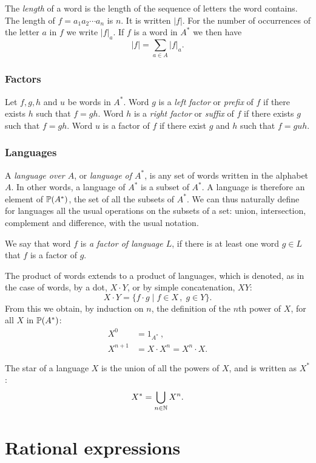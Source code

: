 The \emph{length} of a word is the length of the sequence of letters the word contains. The length of $f = a_1 a_2 \dotsm a_n$ is $n$. It is written $|f|$. For the number of occurrences of the letter $a$ in $f$ we write $|f|_a$. If $f$ is a word in $A^*$ we then have
\[
    |f| = \sum_{a \in A} |f|_a.
\]

\subsubsection*{Factors}

Let $f, g, h$ and $u$ be words in $A^*$. Word $g$ is a \emph{left factor} or \emph{prefix} of $f$ if there exists $h$ such that $f = g h$. Word $h$ is a \emph{right factor} or \emph{suffix} of $f$ if there exists $g$ such that $f = g h$. Word $u$ is a factor of $f$ if there exist $g$ and $h$ such that $f = g u h$.

\subsubsection*{Languages}

A \emph{language over $A$}, or \emph{language of $A^*$}, is any set of words written in the alphabet $A$. In other words, a language of $A^*$ is a subset of $A^*$. A language is therefore an element of $\mathbb{P}(A^*)$, the set of all the subsets of $A^*$. We can thus naturally define for languages all the usual operations on the subsets of a set: union, intersection, complement and difference, with the usual notation.

We say that word $f$ is \emph{a factor of language $L$}, if there is at least one word $g \in L$ that $f$ is a factor of $g$.

The product of words extends to a product of languages, which is denoted, as in the case of words, by a dot, $X \cdot Y$, or by simple concatenation, $X Y$:
\[
    X \cdot Y = \{ f \cdot g \mid f \in X \, , \; g \in Y \}.
\]
From this we obtain, by induction on $n$, the definition of the $n$th power of $X$, for all $X$ in $\mathbb{P}(A^*)$:
\begin{align*}
    X^0 &= 1_{A^*} \: ,\\
    X^{n+1} &= X \cdot X^n = X^n \cdot X.
\end{align*}

The star of a language $X$ is the union of all the powers of $X$, and is written as $X^*$:
\[
    X^* = \bigcup_{n \in \mathbb{N}} X^n.
\]

\section{Rational expressions}

